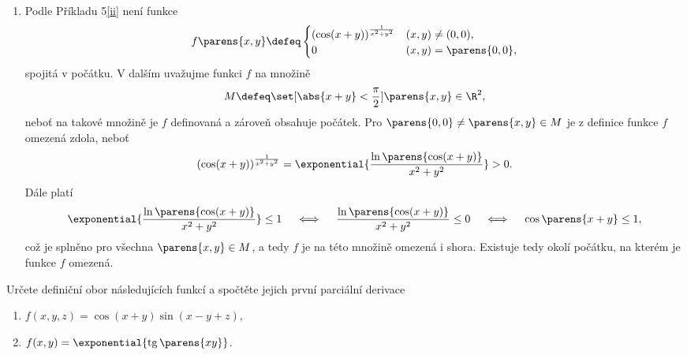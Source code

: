 \documentclass[answers]{exam}
\begin{document}
\begin{questions}
\begin{solution}
\begin{enumerate}[label=(\roman*)]
			\item 
				Podle Příkladu 5\ref{ii} není funkce
				\begin{equation*}
					f\parens{x,y}
					\defeq
					\begin{cases}
						(\cos(x+y))^{\frac{1}{x^2+y^2}} &(x, y) \neq (0, 0),
						\\
						0 &(x, y) = \parens{0, 0},
					\end{cases}
				\end{equation*}
				spojitá v počátku. V dalším uvažujme funkci $f$ na množině
				\begin{equation*}
					M \defeq \set[\abs{x + y} < \frac{\pi}{2}]{\parens{x, y} \in \R^2},
				\end{equation*}
				neboť na takové množině je $f$ definovaná a zároveň obsahuje počátek. Pro $\parens{0, 0} \neq \parens{x, y} \in M$ je z definice funkce $f$ omezená zdola, neboť
				\begin{equation*}
					(\cos(x+y))^{\frac{1}{x^2+y^2}}
					=
					\exponential{\frac{\ln \parens{\cos(x+y)}}{x^2+y^2}}
					>
					0.
				\end{equation*}
				Dále platí
				\begin{equation*}
					\exponential{\frac{\ln \parens{\cos(x+y)}}{x^2+y^2}} \le 1
					\quad \iff \quad
					\frac{\ln \parens{\cos(x+y)}}{x^2+y^2} \le 0
					\quad \iff \quad
					\cos \parens{x + y} \le 1,
				\end{equation*}
				což je splněno pro všechna $\parens{x, y} \in M$, a tedy $f$ je na této množině omezená i shora. Existuje tedy okolí počátku, na kterém je funkce $f$ omezená.
		\end{enumerate}		
	\end{solution}	
	
  \question
	Určete definiční obor n\'asleduj\'ic\'ich funkc\'i a spo\v ct\v ete jejich první parci\'aln\'i derivace
	\begin{enumerate}[label=(\roman*)]
		\item $f(x,y,z)=\cos (x+y)\sin (x-y+z)$,
		\item $f(x,y)=\exponential{{\operatorname{tg} \parens{xy}}}$.
	\end{enumerate}
	    

\end{questions}
\end{document}
